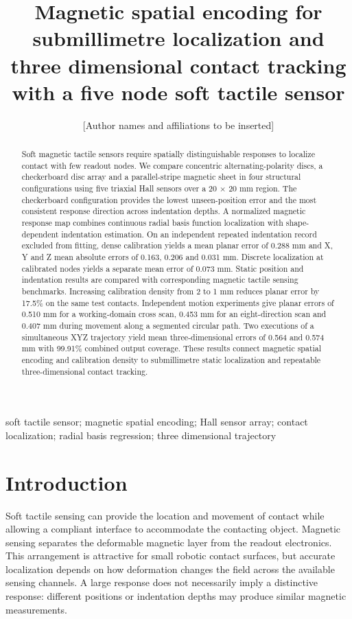 \documentclass[preprint,12pt]{elsarticle}
\begin{document}
\begin{frontmatter}
\title{Magnetic spatial encoding for submillimetre localization and three dimensional contact tracking with a five node soft tactile sensor}
\author{[Author names and affiliations to be inserted]}
\begin{abstract}
Soft magnetic tactile sensors require spatially distinguishable responses to localize contact with few readout nodes. We compare concentric alternating-polarity discs, a checkerboard disc array and a parallel-stripe magnetic sheet in four structural configurations using five triaxial Hall sensors over a 20 \ensuremath{\times} 20 mm region. The checkerboard configuration provides the lowest unseen-position error and the most consistent response direction across indentation depths. A normalized magnetic response map combines continuous radial basis function localization with shape-dependent indentation estimation. On an independent repeated indentation record excluded from fitting, dense calibration yields a mean planar error of 0.288 mm and X, Y and Z mean absolute errors of 0.163, 0.206 and 0.031 mm. Discrete localization at calibrated nodes yields a separate mean error of 0.073 mm. Static position and indentation results are compared with corresponding magnetic tactile sensing benchmarks. Increasing calibration density from 2 to 1 mm reduces planar error by 17.5\% on the same test contacts. Independent motion experiments give planar errors of 0.510 mm for a working-domain cross scan, 0.453 mm for an eight-direction scan and 0.407 mm during movement along a segmented circular path. Two executions of a simultaneous XYZ trajectory yield mean three-dimensional errors of 0.564 and 0.574 mm with 99.91\% combined output coverage. These results connect magnetic spatial encoding and calibration density to submillimetre static localization and repeatable three-dimensional contact tracking.
\end{abstract}
\begin{keyword}
soft tactile sensor; magnetic spatial encoding; Hall sensor array; contact localization; radial basis regression; three dimensional trajectory
\end{keyword}
\end{frontmatter}
\section{Introduction}

Soft tactile sensing can provide the location and movement of contact while allowing a compliant interface to accommodate the contacting object. Magnetic sensing separates the deformable magnetic layer from the readout electronics. This arrangement is attractive for small robotic contact surfaces, but accurate localization depends on how deformation changes the field across the available sensing channels. A large response does not necessarily imply a distinctive response: different positions or indentation depths may produce similar magnetic measurements.
\end{document}

